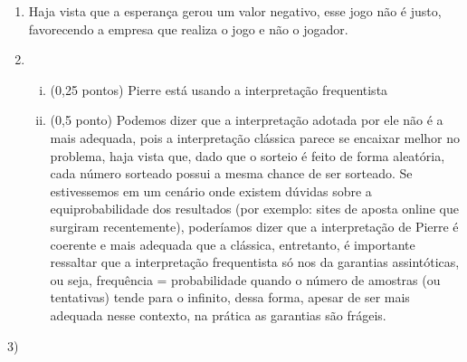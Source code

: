 \documentclass[12pt]{article}
\begin{document}
\begin{enumerate}
    \item Haja vista que a esperança gerou um valor negativo, esse jogo não é justo, favorecendo a empresa que realiza o jogo e não o jogador. 
    \item 
    \begin{enumerate}[i)]
    \item (0,25 pontos) Pierre está usando a interpretação frequentista 
    \item (0,5 ponto)
     Podemos dizer que a interpretação adotada por ele não é a mais adequada, pois a interpretação clássica parece 
     se encaixar melhor no problema, haja vista que, dado que o sorteio é feito de forma aleatória, cada número sorteado possui a mesma chance de ser sorteado. 
     Se estivessemos em um cenário onde existem dúvidas sobre a equiprobabilidade dos resultados (por exemplo: sites de aposta online que surgiram recentemente), poderíamos dizer que a interpretação de Pierre é coerente e mais adequada que a clássica, 
     entretanto, é importante ressaltar que a interpretação frequentista só nos da garantias assintóticas, ou seja, frequência = probabilidade quando o número de amostras (ou tentativas) tende para o infinito, dessa forma, apesar de ser mais adequada nesse contexto, 
    na prática as garantias são frágeis. 
\end{enumerate}
\end{enumerate}



\vspace{5px}


3) 
\end{document}
